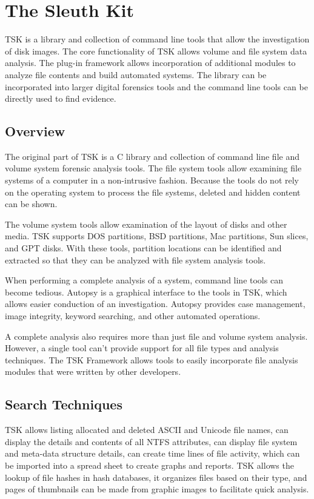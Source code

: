 \section{The Sleuth Kit}

TSK is a library and collection of command line tools that allow the
investigation of disk images. The core functionality of TSK allows volume and file system data analysis.
The plug-in framework allows incorporation of additional modules to analyze file contents
and build automated systems. The library can be incorporated into larger digital forensics tools and
the command line tools can be directly used to find evidence.

\subsection{Overview}

The original part of TSK is a C library and collection of command line
file and volume system forensic analysis tools. The file system tools allow examining file systems
of a computer in a non-intrusive fashion. Because the tools do not rely on the operating system to process
the file systems, deleted and hidden content can be shown.

The volume system tools allow examination of the layout of disks
and other media. TSK supports DOS partitions, BSD partitions, Mac partitions, Sun slices, and 
GPT disks. With these tools, partition locations can be identified 
and extracted so that they can be analyzed with file system analysis tools.

When performing a complete analysis of a system, command line 
tools can become tedious. Autopsy is a graphical interface to the tools in TSK, 
which allows easier conduction of an investigation. Autopsy 
provides case management, image integrity, keyword searching, and other automated
operations.

A complete analysis also requires more than just file and volume system analysis.
However, a single tool can't provide support for all file types and analysis 
techniques. The TSK Framework allows tools to easily incorporate file analysis
modules that were written by other developers.

\subsection{Search Techniques}

TSK allows listing allocated and deleted ASCII and Unicode file names, can display the
details and contents of all NTFS attributes, can display file system and meta-data structure details,
can create time lines of file activity, which can be imported into a spread sheet to create graphs and reports.
TSK allows the lookup of file hashes in hash databases, it organizes files based on their type, and pages of
thumbnails can be made from graphic images to facilitate quick analysis.

